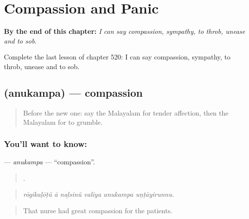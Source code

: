
\chapter{Compassion and Panic}
\label{ch:ml-compassion-and-panic}

\begin{chapteropening}
\textbf{By the end of this chapter:} \emph{I can say compassion, sympathy, to throb, unease and to sob.}

Complete the last lesson of chapter 520: I can say compassion, sympathy, to throb, unease and to sob.
\end{chapteropening}

\section[\texorpdfstring{\ml{അനുകമ്പ} (anukampa)}{അനുകമ്പ (anukampa)}]{ (anukampa) — compassion}

\label{lesson:ML-C520-anukampa}



\begin{quote}
Before the new one: say the Malayalam for tender affection, then the Malayalam for to grumble.
\end{quote}

\subsection*{You'll want to know: }
\textbf{} — \emph{anukampa} — \textquotedblleft{}compassion\textquotedblright{}.

\begin{quote}
     .
\end{quote}

\begin{quote}
\emph{rōgikaḷōṭŭ ā naḻsinŭ valiya anukampa uṇṭāyirunnu.}
\end{quote}

\begin{quote}
That nurse had great compassion for the patients.
\end{quote}

